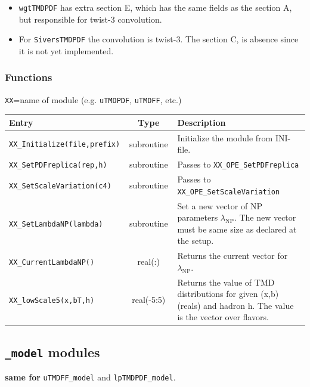\documentclass[prd,nofootinbib,eqsecnum,final]{revtex4}
\renewcommand{\(}{\left(}
\renewcommand{\)}{\right)}
\renewcommand{\[}{\left[}
\renewcommand{\]}{\right]}
\newcommand{\blue}[1]{{\color{blue} #1}}
\begin{document}
\begin{itemize}
\item \texttt{wgtTMDPDF} has extra section E, which has the same fields as the section A, but responsible for twist-3 convolution.
\item For \texttt{SiversTMDPDF} the convolution is twist-3. The section C, is absence since it is not yet implemented.
\end{itemize}

\subsubsection{Functions}

\begin{center}
\texttt{XX}=name of module (e.g. \texttt{uTMDPDF}, \texttt{uTMDFF}, etc.)
\\
\begin{tabular}{||p{5.5cm}||c||p{8.5cm}||}
\hline\hline
Entry &~~Type~~& Description
\\\hline
\texttt{XX\_Initialize(file,prefix)} & subroutine & Initialize the module from INI-file.
\\\hline
\texttt{XX\_SetPDFreplica(rep,h)} & subroutine & Passes to \texttt{XX\_OPE\_SetPDFreplica}
\\\hline
\texttt{XX\_SetScaleVariation(c4)} & subroutine & Passes to \texttt{XX\_OPE\_SetScaleVariation}
\\\hline
\texttt{XX\_SetLambdaNP(lambda)} & subroutine & Set a new vector of NP parameters $\lambda_{\text{NP}}$. The new vector must be same size as declared at the setup.
\\\hline
\texttt{XX\_CurrentLambdaNP()} & real(:) & Returns the current vector for $\lambda_{\text{NP}}$.
\\\hline\hline
\texttt{XX\_lowScale5(x,bT,h)} & real(-5:5) & Returns the value of TMD distributions for given (x,b) (reals) and hadron h. The value is the vector over flavors.
\\\hline\hline
\end{tabular}
\end{center}

\newpage
\subsection{\texttt{\_model} modules}
\begin{center}
\blue{\textbf{same for}} \texttt{uTMDFF\_model} and \texttt{lpTMDPDF\_model}.
\end{center}
\end{document}
